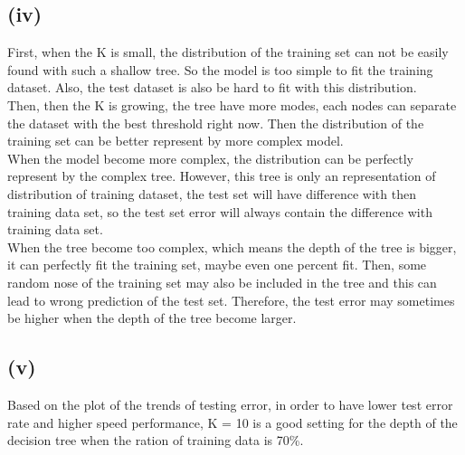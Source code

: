 \documentclass[twoside,11pt]{homework}
\begin{document}
\subsection*{(iv)}
First, when the K is small, the distribution of the training set can not be easily found with such a shallow tree. So the model is too simple to fit the training dataset. Also, the test dataset is also be hard to fit with this distribution.\\
Then, then the K is growing, the tree have more modes, each nodes can separate the dataset with the best threshold right now. Then the distribution of the training set can be better represent by more complex model.\\
When the model become more complex, the distribution can be perfectly represent by the complex tree. However, this tree is only an representation of distribution of training dataset, the test set will have difference with then training data set, so the test set error will always contain the difference with training data set. \\
When the tree become too complex, which means the depth of the tree is bigger, it can perfectly fit the training set, maybe even one percent fit. Then, some random nose of the training set may also be included in the tree and this can lead to wrong prediction of the test set. Therefore, the test error may sometimes be higher when the depth of the tree become larger.
\subsection*{(v)}
Based on the plot of the trends of testing error, in order to have lower test error rate and higher speed performance, K = 10 is a good setting for the depth of the decision tree when the ration of training data is 70\%. 
\end{document}

